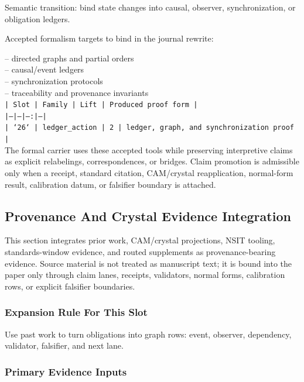 \documentclass[11pt]{article}
\begin{document}
Semantic transition: bind state changes into causal, observer, synchronization, or obligation ledgers.

Accepted formalism targets to bind in the journal rewrite:

\noindent{}-- directed graphs and partial orders\\
\noindent{}-- causal/event ledgers\\
\noindent{}-- synchronization protocols\\
\noindent{}-- traceability and provenance invariants\\

\noindent\texttt{| Slot | Family | Lift | Produced proof form |}\\
\noindent\texttt{|---|---|---:|---|}\\
\noindent\texttt{| `26` | ledger\_action | 2 | ledger, graph, and synchronization proof |}\\

The formal carrier uses these accepted tools while preserving interpretive
claims as explicit relabelings, correspondences, or bridges. Claim promotion is admissible only when a receipt, standard citation,
CAM/crystal reapplication, normal-form result, calibration datum, or falsifier
boundary is attached.

\subsection*{Provenance And Crystal Evidence Integration}

This section integrates prior work, CAM/crystal projections, NSIT tooling,
standards-window evidence, and routed supplements as provenance-bearing
evidence. Source material is not treated as manuscript text; it is bound into
the paper only through claim lanes, receipts, validators, normal forms,
calibration rows, or explicit falsifier boundaries.

\subsubsection*{Expansion Rule For This Slot}

Use past work to turn obligations into graph rows: event, observer, dependency, validator, falsifier, and next lane.

\subsubsection*{Primary Evidence Inputs}
\end{document}
